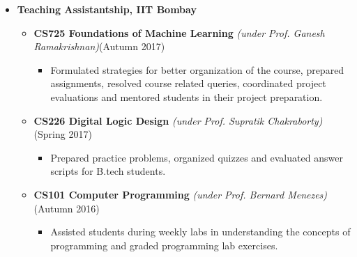 \documentclass[a4paper,10pt]{article}
\newcommand{\psep}{-0.5cm}
\newcommand{\hsep}{-0.6cm}
\begin{document}
\begin{itemize}
	\item \textbf{Teaching Assistantship, IIT Bombay} \\[\hsep]
      \begin{itemize}
              \item \textbf{CS725 Foundations of Machine Learning}  
              \emph{(under Prof. Ganesh Ramakrishnan)}\hfill (Autumn 2017) \\\vspace{-0.5cm}
          \begin{itemize}
              \item Formulated strategies for better organization of the course, prepared assignments, resolved course related queries, coordinated project evaluations and mentored students in their project preparation.
              
          \end{itemize}
          \vspace{-0.1cm}
        
        
          \item \textbf{CS226 Digital Logic Design} \emph{(under Prof. Supratik Chakraborty)}\hfill (Spring 2017) \\\vspace{-0.5cm}
              \begin{itemize}
                   \item Prepared practice problems, organized quizzes and evaluated answer scripts for B.tech students.
              \end{itemize}
               \vspace{-0.1cm}
          
          \item \textbf{CS101 Computer Programming}
              \emph{(under Prof. Bernard Menezes)}\hfill (Autumn 2016) \\\vspace{-0.5cm}
          \begin{itemize}
              \item Assisted students during weekly labs in understanding the concepts of programming and graded programming lab exercises.  \\[\psep]
          \end{itemize}
           \vspace{-0.1cm}
          

\end{itemize}
\end{itemize}
\end{document}
